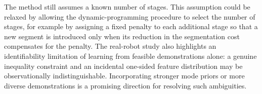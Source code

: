 \documentclass[lettersize,journal]{IEEEtran}
\begin{document}
The method still assumes a known number of stages. This assumption could be relaxed by allowing the dynamic-programming procedure to select the number of stages, for example by assigning a fixed penalty to each additional stage so that a new segment is introduced only when its reduction in the segmentation cost compensates for the penalty. The real-robot study also highlights an identifiability limitation of learning from feasible demonstrations alone: a genuine inequality constraint and an incidental one-sided feature distribution may be observationally indistinguishable. Incorporating stronger mode priors or more diverse demonstrations is a promising direction for resolving such ambiguities.





% 
\end{document}
